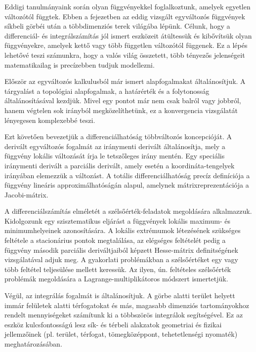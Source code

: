 \label{chap-03}

\bgroup
\color{gray!50!black}
\sffamily

Eddigi tanulmányaink során olyan függvényekkel foglalkoztunk, amelyek egyetlen
változótól függtek. Ebben a fejezetben az eddig vizsgált egyváltozós függvények
síkbeli görbéi után a többdimenziós terek világába lépünk. Célunk, hogy a
differenciál- és integrálszámítás jól ismert eszközeit átültessük és kibővítsük
olyan függvényekre, amelyek kettő vagy több független változótól függenek. Ez a
lépés lehetővé teszi számunkra, hogy a valós világ összetett, több tényezős
jelenségeit matematikailag is precízebben tudjuk modellezni.

Először az egyváltozós kalkulusból már ismert alapfogalmakat általánosítjuk. A
tárgyalást a topológiai alapfogalmak, a határérték és a folytonosság
általánosításával kezdjük. Mivel egy pontot már nem csak balról vagy jobbról,
hanem végtelen sok irányból megközelíthetünk, ez a konvergencia vizsgálatát
lényegesen komplexebbé teszi.

Ezt követően bevezetjük a differenciálhatóság többváltozós koncepcióját. A
derivált egyváltozós fogalmát az iránymenti derivált általánosítja, mely a
függvény lokális változását írja le tetszőleges irány mentén. Egy speciális
iránymenti derivált a parciális derivált, amely esetén a koordináta-tengelyek
irányában elemezzük a változást. A totális differenciálhatóság precíz
definíciója a függvény lineáris approximálhatóságán alapul, amelynek
mátrixreprezentációja a Jacobi-mátrix.

A differenciálszámítás elméletét a szélsőérték-feladatok megoldására
alkalmazzuk. Kidolgozunk egy szisztematikus eljárást a függvények lokális
maximum- és minimumhelyeinek azonosítására. A lokális extrémumok létezésének
szükséges feltétele a stacionárius pontok megtalálása, az elégséges feltételét
pedig a függvény második parciális deriváltjaiból képzett Hesse-mátrix
definitségének vizsgálatával adjuk meg. A gyakorlati problémákban a
szélsőértéket egy vagy több feltétel teljesülése mellett keressük. Az ilyen, ún.
feltételes szélsőérték problémák megoldására a Lagrange-multiplikátoros módszert
ismertetjük.

Végül, az integrálás fogalmát is általánosítjuk. A görbe alatti terület helyett
immár felületek alatti térfogatokat és más, magasabb dimenziós tartományokhoz
rendelt mennyiségeket számítunk ki a többszörös integrálok segítségével. Ez az
eszköz kulcsfontosságú lesz sík- és térbeli alakzatok geometriai és fizikai
jellemzőinek (pl. terület, térfogat, tömegközéppont, tehetetlenségi nyomaték)
meghatározásában.

\chaptertoc
\egroup

\clearpage